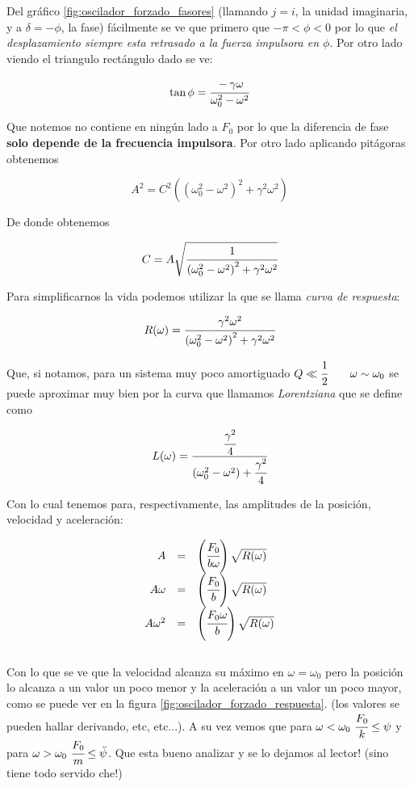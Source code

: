 \documentclass[a4paper,spanish]{article}
\numberwithin{equation}{section}
\begin{document}
Del gr\'afico \ref{fig:oscilador_forzado_fasores} (llamando $j = i$, la unidad imaginaria, y a $\delta = -\phi$, la fase) f\'acilmente se ve que primero que $-\pi<\phi<0$ por lo que \textit{el desplazamiento siempre esta retrasado a la fuerza impulsora en $\phi$}. Por otro lado viendo el triangulo rect\'angulo dado se ve:

\begin{equation}
\tan{\phi}=\cfrac{-\gamma\omega}{\omega_0 ^2 - \omega^2}
\label{fase_forzado_variacion}
\end{equation}

Que notemos no contiene en ning\'un lado a $F_0$ por lo que la diferencia de fase \textbf{solo depende de la frecuencia impulsora}. Por otro lado aplicando pit\'agoras obtenemos

\[A^2=C^2\left(\left(\omega_0 ^2 - \omega^2\right)^2 + \gamma^2\omega^2\right)\]

De donde obtenemos

\begin{equation}
C=A\sqrt{\cfrac{1}{\left(\omega_0 ^2 - \omega^2\right)^2 + \gamma^2\omega^2}}
\end{equation}

Para simplificarnos la vida podemos utilizar la que se llama \textit{curva de respuesta}:

\begin{equation}
R(\omega)=\cfrac{\gamma^2\omega^2}{\left(\omega_0 ^2 - \omega^2\right)^2 + \gamma^2\omega^2}
\end{equation}

Que, si notamos, para un sistema muy poco amortiguado $Q \ll \cfrac{1}{2} \qquad \omega \sim \omega_0$ se puede aproximar muy bien por la curva que llamamos \textit{Lorentziana} que se define como

\begin{equation}
L(\omega)= \cfrac{\cfrac{\gamma^2}{4}}{\left(\omega_0 ^2 - \omega^2\right)+\cfrac{\gamma^2}{4}}
\label{Lorenztiana}
\end{equation}

Con lo cual tenemos para, respectivamente, las amplitudes de la posici\'on, velocidad y aceleraci\'on:

\begin{equation}
\begin{array}{rcl}
A & = & \left(\cfrac{F_0}{b\omega}\right)\sqrt{R(\omega)} \\
A\omega & = & \left(\cfrac{F_0}{b}\right)\sqrt{R(\omega)} \\
A\omega^2 & = & \left(\cfrac{F_0\omega}{b}\right)\sqrt{R(\omega)} 
\end{array}
\label{curvas_respuestas_forzado}
\end{equation}
\\
Con lo que se ve que la velocidad alcanza su m\'aximo en $\omega=\omega_0$ pero la posici\'on lo alcanza a un valor un poco menor y la aceleraci\'on a un valor un poco mayor, como se puede ver en la figura \ref{fig:oscilador_forzado_respuesta}. (los valores se pueden hallar derivando, etc, etc...). A su vez vemos que para $\omega<\omega_0 \ \cfrac{F_0}{k}\leq \psi$ y para $\omega>\omega_0 \ \cfrac{F_0}{m}\leq \ddot{\psi}$. Que esta bueno analizar y se lo dejamos al lector! (sino tiene todo servido che!)
\end{document}
